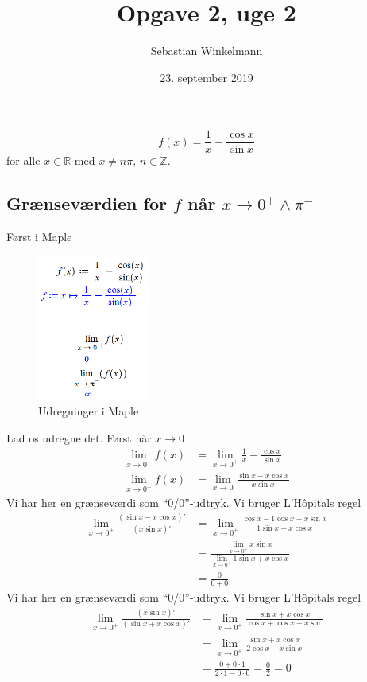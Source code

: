 \documentclass{report}
\title{Opgave 2, uge 2}
\author{Sebastian Winkelmann}
\date{23. september 2019}
\begin{document}

\setcounter{chapter}{2}
\section{}
$$f(x)=\frac{1}{x}-\frac{\cos{x}}{\sin{x}}$$for alle $x\in\mathbb{R}$ med $x\neq n\pi,\, n\in\mathbb{Z}$.
\subsection{Grænseværdien for $f$ når $x\to0^+\land\pi^-$}
Først i Maple
\begin{figure}[H]
    \centering
    \includegraphics[width=0.333\textwidth]{limit21.png}
    \caption{Udregninger i Maple}
    \label{fig:limit21}
\end{figure}
Lad os udregne det. Først når $x\to0^+$
\begin{align*}
    \lim_{x\to0^+}f(x)&=\lim_{x\to0^+}\frac{1}{x}-\frac{\cos{x}}{\sin{x}}\\
    \lim_{x\to0^+}f(x)&=\lim_{x\to0}\frac{\sin{x}-x\cos{x}}{x\sin{x}}\end{align*}
Vi har her en grænseværdi som \enquote{0/0}-udtryk. Vi bruger L'Hôpitals regel
\begin{align*}
    \lim_{x\to0^+}\frac{(\sin{x}-x\cos{x})'}{(x\sin{x})'}&=\lim_{x\to0^+}\frac{\cos{x}-1\cos{x}+x\sin{x}}{1\sin{x}+x\cos{x}}\\
    &=\frac{\lim_{x\to0^+}x\sin{x}}{\lim_{x\to0^+}1\sin{x}+x\cos{x}}\\
    &=\frac{0}{0+0}
\end{align*}
Vi har her en grænseværdi som \enquote{0/0}-udtryk. Vi bruger L'Hôpitals regel
\begin{align*}
    \lim_{x\to0^+}\frac{(x\sin{x})'}{(\sin{x}+x\cos{x})'}&=\lim_{x\to0^+}\frac{\sin{x}+x\cos{x}}{\cos{x}+\cos{x}-x\sin}\\&=\lim_{x\to0^+}\frac{\sin{x}+x\cos{x}}{2\cos{x}-x\sin{x}}\\
    &=\frac{0+0\cdot1}{2\cdot1-0\cdot0}=\frac{0}{2}=0
\end{align*}
\end{document}
